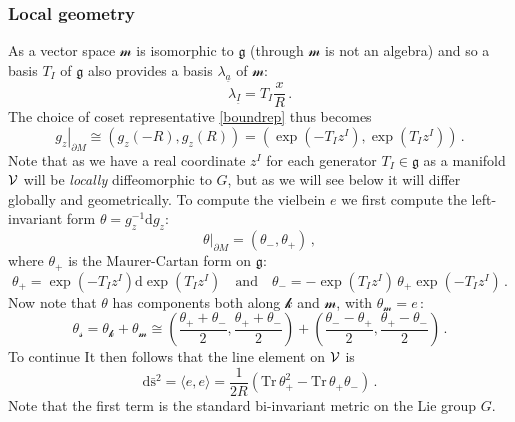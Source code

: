 \documentclass[11pt,a4paper]{article}
\def\calsk{\boldsymbol{\mathscr k}}
\def\calsm{{\boldsymbol{\mathscr m}}}
\def\calss{{\boldsymbol{\mathscr s}}}
\def\calv{{\cal V}}
\def\ua{{\underline{a}}}
\def\uI{{\underline{I}}}
\def\rd{{\mathrm{d}}}
\def\Tr{\mathrm{Tr}}
\begin{document}
    \subsubsection{Local geometry}
    As a vector space $\calsm$ is isomorphic to $\mathfrak{g}$ (through $\calsm$ is not an algebra) and so a basis $T_I$ of $\mathfrak{g}$ also provides a basis $\lambda_\ua$ of $\calsm$:
    \begin{equation}
    \lambda_\uI=T_I\frac{x}{R}\,.
    \end{equation}
    The choice of coset representative \eqref{boundrep} thus becomes
    \begin{equation}
    \left.g_z\right|_{\partial M}\cong (g_z(-R),g_z(R))=(\exp(-T_I z^I),\exp(T_I z^I))  \,.
    \end{equation}
    Note that as we have a real coordinate $z^I$ for each generator $T_I\in\mathfrak{g}$ as a manifold $\calv$ will be {\it locally} diffeomorphic to $G$, but as we will see below it will differ globally and geometrically.
    To compute the vielbein $e$ we first compute the left-invariant form $\theta=g^{-1}_z\rd g_z$:
    \begin{equation}
    \left.\theta\right|_{\partial M}=(\theta_-,\theta_+)\,,
    \end{equation}
    where $\theta_+$ is the Maurer-Cartan form on $\mathfrak{g}$:
    \begin{equation}
    \theta_+=\exp(-T_I z^I)\rd \exp(T_I z^I)\quad\mbox{and}\quad \theta_-=-\exp(T_I z^I)\,\theta_+ \exp(-T_I z^I)\,.
    \end{equation}
    Now note that $\theta$ has components both along $\calsk$ and $\calsm$, with $\theta_\calsm=e$\,:
    \begin{equation}
    \theta_\calss=\theta_{\calsk}+\theta_{\calsm} \cong\left(\frac{\theta_++\theta_-}{2},\frac{\theta_++\theta_-}{2}\right)+\left(\frac{\theta_--\theta_+}{2},\frac{\theta_+-\theta_-}{2}\right)\,.
    \end{equation}
    To continue    It then follows that the line element on $\calv$ is
    \begin{equation}
    \rd\bar{\mathrm{s}}^2=\langle e,e\rangle=\frac{1}{2R}\left(\Tr\,\theta_+^2-\Tr\,\theta_+\theta_-\right)\label{1dmet}\,.
    \end{equation}
    Note that the first term is the standard bi-invariant metric on the Lie group $G$.
        
\end{document}
